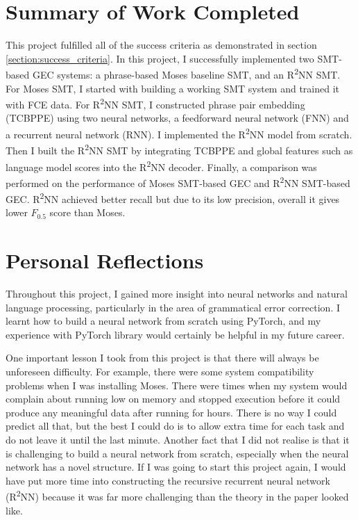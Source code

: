 \documentclass[12pt,a4paper,twoside,openright]{report}
\begin{document}
\section{Summary of Work Completed}
This project fulfilled all of the success criteria as demonstrated in section \ref{section:success_criteria}. In this project, I successfully implemented two SMT-based GEC systems: a phrase-based Moses baseline SMT, and an R\textsuperscript{2}NN SMT. For Moses SMT, I started with building a working SMT system and trained it with FCE data. For R\textsuperscript{2}NN SMT, I constructed phrase pair embedding (TCBPPE) using two neural networks, a feedforward neural network (FNN) and a recurrent neural network (RNN). I implemented the R\textsuperscript{2}NN model from scratch. Then I built the R\textsuperscript{2}NN SMT by integrating TCBPPE and global features such as language model scores into the R\textsuperscript{2}NN decoder. Finally, a comparison was performed on the performance of Moses SMT-based GEC and R\textsuperscript{2}NN SMT-based GEC. R\textsuperscript{2}NN achieved better recall but due to its low precision, overall it gives lower $F_{0.5}$ score than Moses. 

\section{Personal Reflections}
Throughout this project, I gained more insight into neural networks and natural language processing, particularly in the area of grammatical error correction. I learnt how to build a neural network from scratch using PyTorch, and my experience with PyTorch library would certainly be helpful in my future career. 

One important lesson I took from this project is that there will always be unforeseen difficulty. For example, there were some system compatibility problems when I was installing Moses. There were times when my system would complain about running low on memory and stopped execution before it could produce any meaningful data after running for hours. There is no way I could predict all that, but the best I could do is to allow extra time for each task and do not leave it until the last minute. Another fact that I did not realise is that it is challenging to build a neural network from scratch, especially when the neural network has a novel structure. If I was going to start this project again, I would have put more time into constructing the recursive recurrent neural network (R\textsuperscript{2}NN) because it was far more challenging than the theory in the paper\cite{r2nn} looked like.
\end{document}
